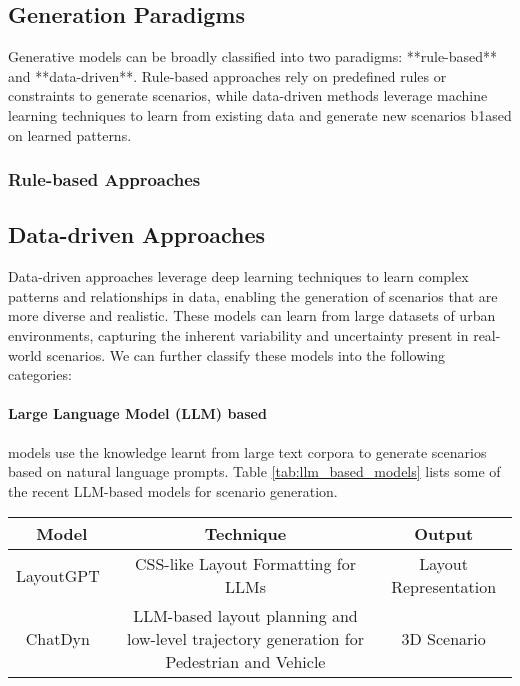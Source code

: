 \documentclass{article}
\begin{document}
\begin{table}[ht]
\subsection{Generation Paradigms}

Generative models can be broadly classified into two paradigms: **rule-based** and **data-driven**. Rule-based approaches rely on predefined rules or constraints to generate scenarios, while data-driven methods leverage machine learning techniques to learn from existing data and generate new scenarios b1ased on learned patterns.

\subsubsection{Rule-based Approaches}

\subsection{Data-driven Approaches}

Data-driven  approaches leverage deep learning techniques to learn complex patterns and relationships in data, enabling the generation of scenarios that are more diverse and realistic. These models can learn from large datasets of urban environments, capturing the inherent variability and uncertainty present in real-world scenarios. We can further classify these models into the following categories:

\paragraph{Large Language Model (LLM) based} models use the knowledge learnt from large text corpora to generate scenarios based on natural language prompts. Table \ref{tab:llm_based_models} lists some of the recent LLM-based models for scenario generation.

\begin{table}[ht]
    \centering
    \begin{tabular}{|c|c|c|}
        \hline
        \textbf{Model} & \textbf{Technique} & \textbf{Output} \\ \hline        
        LayoutGPT~\cite{feng2023layoutgpt} & CSS-like Layout Formatting for LLMs & Layout Representation \\ \hline
        ChatDyn~\cite{wei2024chatdyn} & LLM-based layout planning and low-level trajectory generation for Pedestrian and Vehicle & 3D Scenario \\ 


\end{tabular}
\end{table}
\end{table}
\end{document}
